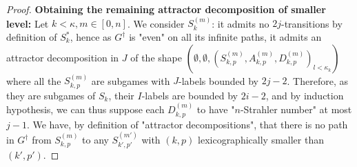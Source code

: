 \documentclass[a4paper,UKenglish,cleveref, autoref, thm-restate]{lipics-v2021}
\begin{document}
\begin{proof}
	\textbf{Obtaining the remaining attractor decomposition of smaller level:} Let $k<\kappa, m\in [0,n]$. We consider $S_k^{(m)}$: it admits no $2j$-transitions by definition of $S^*_k$, hence as $G^\dagger$ is "even" on all its infinite paths, it admits an attractor decomposition in $J$ of the shape $(\emptyset, \emptyset, (S^{(m)}_{k,p}, A^{(m)}_{k,p}, D^{(m)}_{k,p})_{l<\kappa_k})$ where all the $S^{(m)}_{k,p}$ are subgames with $J$-labels bounded by $2j-2$. Therefore, as they are subgames of $S_k$, their $I$-labels are bounded by $2i-2$, and by induction hypothesis, we can thus suppose each $D^{(m)}_{k,p}$ to have "$n$-Strahler number" at most $j-1$. We have, by definition of "attractor decompositions", that there is no path in $G^\dagger$ from $S^{(m)}_{k,p}$ to any $S^{(m')}_{k',p'}$ with $(k,p)$ lexicographically smaller than $(k',p')$.
	

\end{proof}
\end{document}
